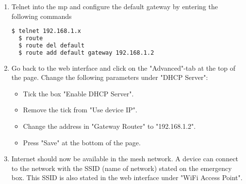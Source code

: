 \begin{enumerate}
\item Telnet into the \gls{mp} and configure the default gateway by entering the following commands
\begin{lstlisting}[language=bash]
  $ telnet 192.168.1.x
  $ route 
  $ route del default 
  $ route add default gateway 192.168.1.2
\end{lstlisting} 

\item Go back to the web interface and click on the "Advanced"-tab at the top of the page. Change the following parameters under "DHCP Server":
\begin{itemize}
\item Tick the box "Enable DHCP Server".
\item Remove the tick from "Use device IP".
\item Change the address in "Gateway Router" to "192.168.1.2".
\item Press "Save" at the bottom of the page. 
\end{itemize}

\item Internet should now be available in the mesh network. A device can connect to the network with the SSID (name of network) stated on the emergency box. This SSID is also stated in the web interface under "WiFi Access Point".  
\end{enumerate}
